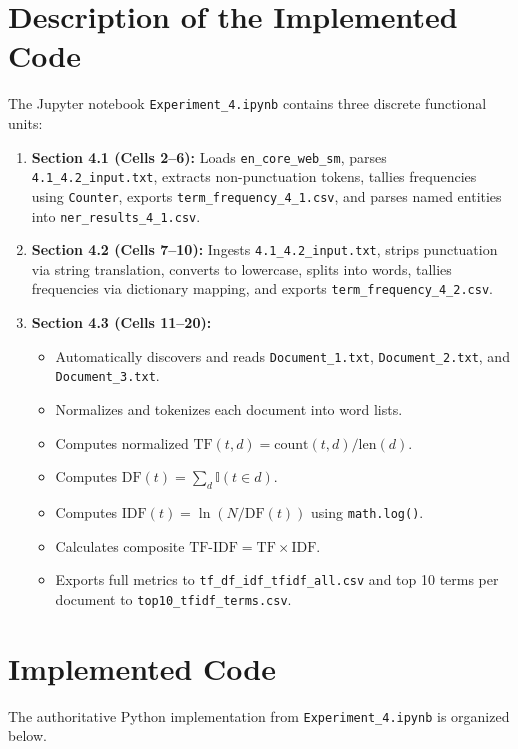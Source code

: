 \documentclass[12pt,a4paper]{report}
\begin{document}
\section{Description of the Implemented Code}
The Jupyter notebook \texttt{Experiment\_4.ipynb} contains three discrete functional units:
\begin{enumerate}
    \item \textbf{Section 4.1 (Cells 2--6):} Loads \texttt{en\_core\_web\_sm}, parses \texttt{4.1\_4.2\_input.txt}, extracts non-punctuation tokens, tallies frequencies using \texttt{Counter}, exports \texttt{term\_frequency\_4\_1.csv}, and parses named entities into \texttt{ner\_results\_4\_1.csv}.
    \item \textbf{Section 4.2 (Cells 7--10):} Ingests \texttt{4.1\_4.2\_input.txt}, strips punctuation via string translation, converts to lowercase, splits into words, tallies frequencies via dictionary mapping, and exports \texttt{term\_frequency\_4\_2.csv}.
    \item \textbf{Section 4.3 (Cells 11--20):}
    \begin{itemize}
        \item Automatically discovers and reads \texttt{Document\_1.txt}, \texttt{Document\_2.txt}, and \texttt{Document\_3.txt}.
        \item Normalizes and tokenizes each document into word lists.
        \item Computes normalized $\text{TF}(t, d) = \text{count}(t, d) / \text{len}(d)$.
        \item Computes $\text{DF}(t) = \sum_{d} \mathbb{I}(t \in d)$.
        \item Computes $\text{IDF}(t) = \ln(N / \text{DF}(t))$ using \texttt{math.log()}.
        \item Calculates composite $\text{TF-IDF} = \text{TF} \times \text{IDF}$.
        \item Exports full metrics to \texttt{tf\_df\_idf\_tfidf\_all.csv} and top 10 terms per document to \texttt{top10\_tfidf\_terms.csv}.
    \end{itemize}
\end{enumerate}

\section{Implemented Code}
The authoritative Python implementation from \texttt{Experiment\_4.ipynb} is organized below.
\end{document}
